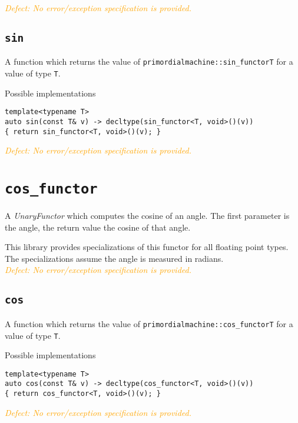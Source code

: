 \documentclass[oneside]{report}
\begin{document}
\noindent{}\textcolor{orange}{\textit{Defect: No error/exception specification is provided.}}

\subsection{\texttt{sin}}
A function which returns the value of \texttt{primordialmachine::sin\_functor\textlangle T\textrangle}
for a value of type \texttt{T}.

\noindent{}Possible implementations
\begin{verbatim}
template<typename T>
auto sin(const T& v) -> decltype(sin_functor<T, void>()(v))
{ return sin_functor<T, void>()(v); }
\end{verbatim}

\noindent{}\textcolor{orange}{\textit{Defect: No error/exception specification is provided.}}

\section{\texttt{cos\_functor}}
A \textit{UnaryFunctor} which computes the
cosine
of an angle.
The first parameter is the angle, the return value the cosine of that angle.

\noindent{}This library provides specializations of this functor for all floating point types.
The specializations assume the angle is measured in radians.\\

\noindent{}\textcolor{orange}{\textit{Defect: No error/exception specification is provided.}}

\subsection{\texttt{cos}}
A function which returns the value of \texttt{primordialmachine::cos\_functor\textlangle T\textrangle}
for a value of type \texttt{T}.

\noindent{}Possible implementations
\begin{verbatim}
template<typename T>
auto cos(const T& v) -> decltype(cos_functor<T, void>()(v))
{ return cos_functor<T, void>()(v); }
\end{verbatim}

\noindent{}\textcolor{orange}{\textit{Defect: No error/exception specification is provided.}}

\end{document}
